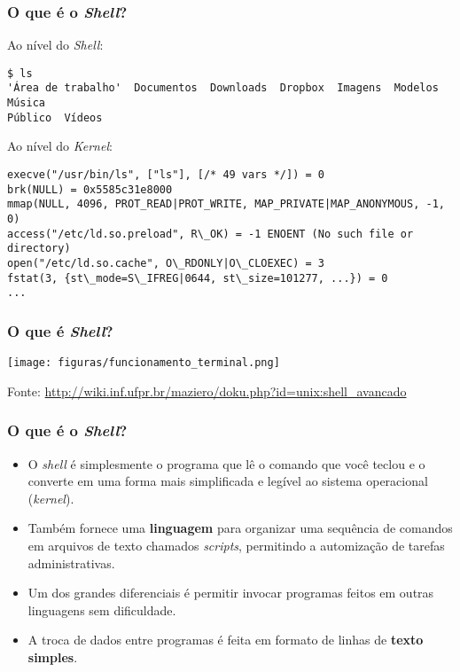 \documentclass{beamer}
\begin{document}
\begin{frame}[fragile]
      \frametitle{O que é o \textit{Shell}?}
	      \scriptsize
      \begin{block}{Ao nível do \textit{Shell}:}
      \begin{verbatim}
$ ls 
'Área de trabalho'  Documentos  Downloads  Dropbox  Imagens  Modelos  Música 
Público  Vídeos
      \end{verbatim}
      \end{block}
      \begin{block}{Ao nível do \textit{Kernel}:}
      \scriptsize
      \begin{verbatim}
execve("/usr/bin/ls", ["ls"], [/* 49 vars */]) = 0 
brk(NULL) = 0x5585c31e8000 
mmap(NULL, 4096, PROT_READ|PROT_WRITE, MAP_PRIVATE|MAP_ANONYMOUS, -1, 0) 
access("/etc/ld.so.preload", R\_OK) = -1 ENOENT (No such file or directory) 
open("/etc/ld.so.cache", O\_RDONLY|O\_CLOEXEC) = 3 
fstat(3, {st\_mode=S\_IFREG|0644, st\_size=101277, ...}) = 0 
...
      \end{verbatim}
      \end{block}
\end{frame}

\begin{frame}
   \frametitle{O que é \textit{Shell}?}
   \begin{center}
   \texttt{[image: figuras/funcionamento\_terminal.png]}
   \end{center}
   \tiny
   Fonte: \url{http://wiki.inf.ufpr.br/maziero/doku.php?id=unix:shell_avancado}
\end{frame}

   \begin{frame}
      \frametitle{O que é o \textit{Shell}?}
      \begin{itemize}
         \item O \textit{shell} é simplesmente o programa que lê o comando que você teclou e o converte em uma forma mais simplificada e legível ao sistema operacional (\textit{kernel}). 
         \item Também fornece uma \textbf{linguagem} para organizar uma sequência de comandos em  arquivos de texto chamados \textit{scripts}, permitindo a automização de tarefas administrativas. 
	      \item Um dos grandes diferenciais é permitir invocar programas feitos em outras linguagens sem dificuldade.
	      \item A troca de dados entre programas é feita em formato de linhas de \textbf{texto simples}.
      \end{itemize}
   \end{frame}
\end{document}
